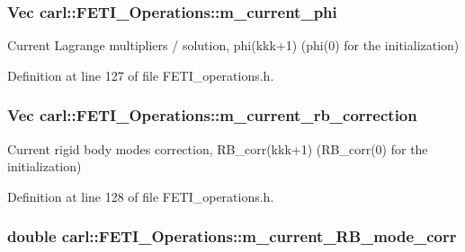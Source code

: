 \subsubsection[{m\+\_\+current\+\_\+phi}]{\setlength{\rightskip}{0pt plus 5cm}Vec carl\+::\+F\+E\+T\+I\+\_\+\+Operations\+::m\+\_\+current\+\_\+phi\hspace{0.3cm}{\ttfamily [protected]}}\label{classcarl_1_1_f_e_t_i___operations_ac0f0857e6070cde78612b0ce5e1005e8}


Current Lagrange multipliers / solution, {\ttfamily phi(kkk+1)} ({\ttfamily phi(0)} for the initialization) 



Definition at line 127 of file F\+E\+T\+I\+\_\+operations.\+h.

\hypertarget{classcarl_1_1_f_e_t_i___operations_a482c32e0a89fe4c8aca206ec4e04c67a}{}
\subsubsection[{m\+\_\+current\+\_\+rb\+\_\+correction}]{\setlength{\rightskip}{0pt plus 5cm}Vec carl\+::\+F\+E\+T\+I\+\_\+\+Operations\+::m\+\_\+current\+\_\+rb\+\_\+correction\hspace{0.3cm}{\ttfamily [protected]}}\label{classcarl_1_1_f_e_t_i___operations_a482c32e0a89fe4c8aca206ec4e04c67a}


Current rigid body modes correction, {\ttfamily R\+B\+\_\+corr(kkk+1)} ({\ttfamily R\+B\+\_\+corr(0)} for the initialization) 



Definition at line 128 of file F\+E\+T\+I\+\_\+operations.\+h.

\hypertarget{classcarl_1_1_f_e_t_i___operations_a22ebb1138a1a8ca2b88d33c17a8fe299}{}
\subsubsection[{m\+\_\+current\+\_\+\+R\+B\+\_\+mode\+\_\+corr}]{\setlength{\rightskip}{0pt plus 5cm}double carl\+::\+F\+E\+T\+I\+\_\+\+Operations\+::m\+\_\+current\+\_\+\+R\+B\+\_\+mode\+\_\+corr\hspace{0.3cm}{\ttfamily [protected]}}\label{classcarl_1_1_f_e_t_i___operations_a22ebb1138a1a8ca2b88d33c17a8fe299}


